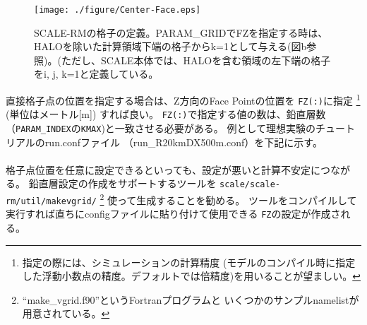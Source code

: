 \begin{figure}[h]
\begin{center}
  \texttt{[image: ./figure/Center-Face.eps]}\\
  \caption{SCALE-RMの格子の定義。PARAM\_GRIDでFZを指定する時は、HALOを除いた計算領域下端の格子からk=1として与える(図b参照)。(ただし、SCALE本体では、HALOを含む領域の左下端の格子をi, j, k=1と定義している。}
  \label{fig:scale_grid}
\end{center}
\end{figure}



直接格子点の位置を指定する場合は、Z方向のFace Pointの位置を
\verb|FZ(:)|に指定
\footnote{指定の際には、シミュレーションの計算精度
(モデルのコンパイル時に指定した浮動小数点の精度。デフォルトでは倍精度)を用いることが望ましい。}
(単位はメートル[m]) すれば良い。
\verb|FZ(:)|で指定する値の数は、鉛直層数（\verb|PARAM_INDEX|の\verb|KMAX|)と一致させる必要がある。
例として理想実験のチュートリアルのrun.confファイル
（run\_R20kmDX500m.conf）を下記に示す。\\

\\


格子点位置を任意に設定できるといっても、設定が悪いと計算不安定につながる。
鉛直層設定の作成をサポートするツールを
\verb|scale/scale-rm/util/makevgrid/|
\footnote{``make\_vgrid.f90''というFortranプログラムと
いくつかのサンプルnamelistが用意されている。}
使って生成することを勧める。
ツールをコンパイルして実行すれば直ちにconfigファイルに貼り付けて使用できる
\verb|FZ|の設定が作成される。

